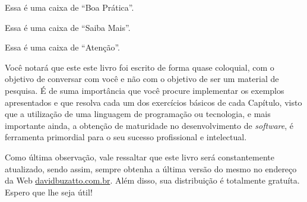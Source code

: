 \begin{boaPratica}
    Essa é uma caixa de ``Boa Prática''.
\end{boaPratica}

\begin{saibaMais}
    Essa é uma caixa de ``Saiba Mais''.
\end{saibaMais}

\begin{atencao}
    Essa é uma caixa de ``Atenção''.
\end{atencao}

Você notará que este este livro foi escrito de forma quase coloquial, com o objetivo de conversar com você e não com o objetivo de ser um material de pesquisa. É de suma importância que você procure implementar os exemplos apresentados e que resolva cada um dos exercícios básicos de cada Capítulo, visto que a utilização de uma linguagem de programação ou tecnologia, e mais importante ainda, a obtenção de maturidade no desenvolvimento de \textit{software}, é ferramenta primordial para o seu sucesso profissional e intelectual.

Como última observação, vale ressaltar que este livro será constantemente atualizado, sendo assim, sempre obtenha a última versão do mesmo no endereço da Web \textcolor{corAzulTema}{\href{http://davidbuzatto.com.br}{davidbuzatto.com.br}}. Além disso, sua distribuição é totalmente gratuíta. Espero que lhe seja útil!

\vspace*{\fill}
